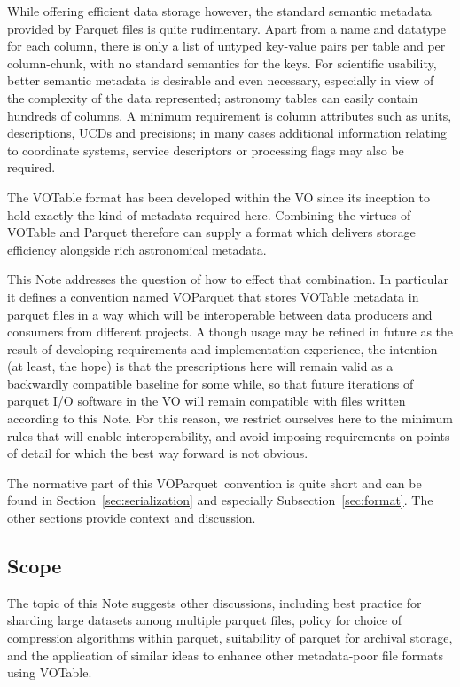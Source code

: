 \documentclass[11pt,a4paper]{ivoa}
\newcommand{\voparquet}{VOParquet}
\begin{document}
While offering efficient data storage however,
the standard semantic metadata provided by Parquet files is quite rudimentary.
Apart from a name and datatype for each column,
there is only a list of untyped key-value pairs per table
and per column-chunk, with no standard semantics for the keys.
For scientific usability, better semantic metadata
is desirable and even necessary,
especially in view of the complexity of the data represented;
astronomy tables can easily contain hundreds of columns.
A minimum requirement is column attributes such as units, descriptions,
UCDs and precisions; in many cases additional information relating to
coordinate systems, service descriptors or processing flags
may also be required.

The VOTable format \citep{2019ivoa.spec.1021O}
has been developed within the VO since its
inception to hold exactly the kind of metadata required here.
Combining the virtues of VOTable and Parquet therefore
can supply a format which delivers storage efficiency alongside
rich astronomical metadata.

This Note addresses the question of how to effect that combination.
In particular it defines a convention named {\voparquet}
that stores VOTable metadata in parquet files in a way
which will be interoperable
between data producers and consumers from different projects.
Although usage may be refined in future as the result of
developing requirements and implementation experience,
the intention (at least, the hope) is that the
prescriptions here will remain valid as a backwardly compatible
baseline for some while, so that future iterations of parquet I/O
software in the VO will remain compatible with files written
according to this Note.
For this reason, we restrict ourselves here to the minimum rules
that will enable interoperability, and avoid imposing requirements
on points of detail for which the best way forward is not obvious.

The normative part of this \voparquet\ convention
is quite short and can be found in Section~\ref{sec:serialization}
and especially Subsection~\ref{sec:format}.
The other sections provide context and discussion.

\subsection{Scope}
\label{sec:scope}

The topic of this Note suggests other discussions, including
best practice for sharding large datasets among multiple parquet files,
policy for choice of compression algorithms within parquet,
suitability of parquet for archival storage,
and the application of similar ideas to enhance other metadata-poor
file formats using VOTable.
\end{document}
